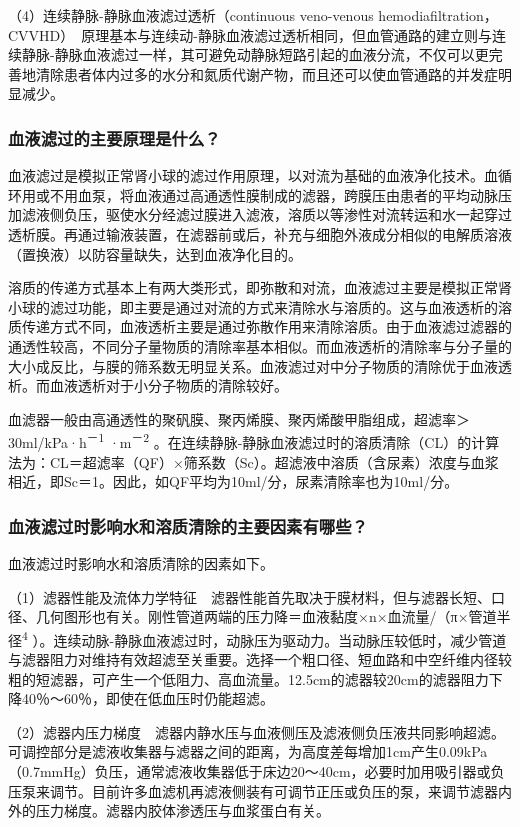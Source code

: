 （4）连续静脉-静脉血液滤过透析（continuous veno-venous
hemodiafiltration，CVVHD）　原理基本与连续动-静脉血液滤过透析相同，但血管通路的建立则与连续静脉-静脉血液滤过一样，其可避免动静脉短路引起的血液分流，不仅可以更完善地清除患者体内过多的水分和氮质代谢产物，而且还可以使血管通路的并发症明显减少。

\subsubsection{血液滤过的主要原理是什么？}

血液滤过是模拟正常肾小球的滤过作用原理，以对流为基础的血液净化技术。血循环用或不用血泵，将血液通过高通透性膜制成的滤器，跨膜压由患者的平均动脉压加滤液侧负压，驱使水分经滤过膜进入滤液，溶质以等渗性对流转运和水一起穿过透析膜。再通过输液装置，在滤器前或后，补充与细胞外液成分相似的电解质溶液（置换液）以防容量缺失，达到血液净化目的。

溶质的传递方式基本上有两大类形式，即弥散和对流，血液滤过主要是模拟正常肾小球的滤过功能，即主要是通过对流的方式来清除水与溶质的。这与血液透析的溶质传递方式不同，血液透析主要是通过弥散作用来清除溶质。由于血液滤过滤器的通透性较高，不同分子量物质的清除率基本相似。而血液透析的清除率与分子量的大小成反比，与膜的筛系数无明显关系。血液滤过对中分子物质的清除优于血液透析。而血液透析对于小分子物质的清除较好。

血滤器一般由高通透性的聚矾膜、聚丙烯膜、聚丙烯酸甲脂组成，超滤率＞30ml/kPa·h\textsuperscript{－1}
·m\textsuperscript{－2}
。在连续静脉-静脉血液滤过时的溶质清除（CL）的计算法为：CL＝超滤率（QF）×筛系数（Sc）。超滤液中溶质（含尿素）浓度与血浆相近，即Sc＝1。因此，如QF平均为10ml/分，尿素清除率也为10ml/分。

\subsubsection{血液滤过时影响水和溶质清除的主要因素有哪些？}

血液滤过时影响水和溶质清除的因素如下。

（1）滤器性能及流体力学特征　滤器性能首先取决于膜材料，但与滤器长短、口径、几何图形也有关。刚性管道两端的压力降＝血液黏度×n×血流量/（π×管道半径\textsuperscript{4}
）。连续动脉-静脉血液滤过时，动脉压为驱动力。当动脉压较低时，减少管道与滤器阻力对维持有效超滤至关重要。选择一个粗口径、短血路和中空纤维内径较粗的短滤器，可产生一个低阻力、高血流量。12.5cm的滤器较20cm的滤器阻力下降40％～60％，即使在低血压时仍能超滤。

（2）滤器内压力梯度　滤器内静水压与血液侧压及滤液侧负压液共同影响超滤。可调控部分是滤液收集器与滤器之间的距离，为高度差每增加1cm产生0.09kPa（0.7mmHg）负压，通常滤液收集器低于床边20～40cm，必要时加用吸引器或负压泵来调节。目前许多血滤机再滤液侧装有可调节正压或负压的泵，来调节滤器内外的压力梯度。滤器内胶体渗透压与血浆蛋白有关。

